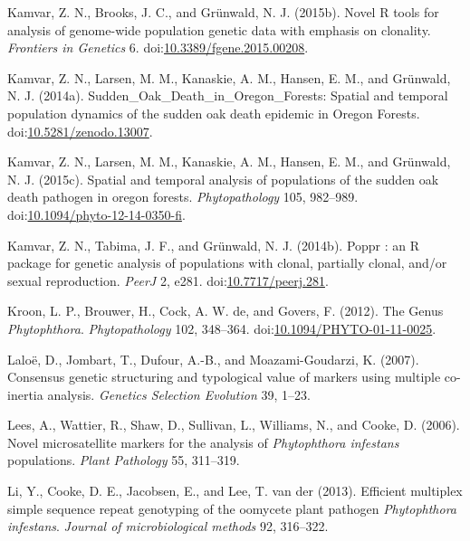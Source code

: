 \documentclass[double,12pt]{beavtex}
\begin{document}
  \hypertarget{ref-kamvar2015novel}{}
  Kamvar, Z. N., Brooks, J. C., and Grünwald, N. J. (2015b). Novel R tools
  for analysis of genome-wide population genetic data with emphasis on
  clonality. \emph{Frontiers in Genetics} 6.
  doi:\href{https://doi.org/10.3389/fgene.2015.00208}{10.3389/fgene.2015.00208}.
  
  \hypertarget{ref-kamvar2014sudden}{}
  Kamvar, Z. N., Larsen, M. M., Kanaskie, A. M., Hansen, E. M., and
  Grünwald, N. J. (2014a). Sudden\_Oak\_Death\_in\_Oregon\_Forests:
  Spatial and temporal population dynamics of the sudden oak death
  epidemic in Oregon Forests.
  doi:\href{https://doi.org/10.5281/zenodo.13007}{10.5281/zenodo.13007}.
  
  \hypertarget{ref-kamvar2015spatial}{}
  Kamvar, Z. N., Larsen, M. M., Kanaskie, A. M., Hansen, E. M., and
  Grünwald, N. J. (2015c). Spatial and temporal analysis of populations of
  the sudden oak death pathogen in oregon forests. \emph{Phytopathology}
  105, 982--989.
  doi:\href{https://doi.org/10.1094/phyto-12-14-0350-fi}{10.1094/phyto-12-14-0350-fi}.
  
  \hypertarget{ref-kamvar2014poppr}{}
  Kamvar, Z. N., Tabima, J. F., and Grünwald, N. J. (2014b). Poppr : an R
  package for genetic analysis of populations with clonal, partially
  clonal, and/or sexual reproduction. \emph{PeerJ} 2, e281.
  doi:\href{https://doi.org/10.7717/peerj.281}{10.7717/peerj.281}.
  
  \hypertarget{ref-kroon2012genus}{}
  Kroon, L. P., Brouwer, H., Cock, A. W. de, and Govers, F. (2012). The
  Genus \emph{Phytophthora}. \emph{Phytopathology} 102, 348--364.
  doi:\href{https://doi.org/10.1094/PHYTO-01-11-0025}{10.1094/PHYTO-01-11-0025}.
  
  \hypertarget{ref-laloe2007consensus}{}
  Laloë, D., Jombart, T., Dufour, A.-B., and Moazami-Goudarzi, K. (2007).
  Consensus genetic structuring and typological value of markers using
  multiple co-inertia analysis. \emph{Genetics Selection Evolution} 39,
  1--23.
  
  \hypertarget{ref-lees2006novel}{}
  Lees, A., Wattier, R., Shaw, D., Sullivan, L., Williams, N., and Cooke,
  D. (2006). Novel microsatellite markers for the analysis of
  \emph{Phytophthora infestans} populations. \emph{Plant Pathology} 55,
  311--319.
  
  \hypertarget{ref-li2013efficient}{}
  Li, Y., Cooke, D. E., Jacobsen, E., and Lee, T. van der (2013).
  Efficient multiplex simple sequence repeat genotyping of the oomycete
  plant pathogen \emph{Phytophthora infestans}. \emph{Journal of
  microbiological methods} 92, 316--322.
  
\end{document}
